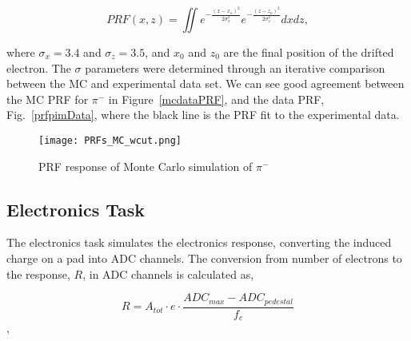 \begin{equation}
PRF(x,z) = \iint e^{-\frac{(x-x_o)^2}{2\sigma_x^2}} e^{-\frac{(z-z_o)^2}{2\sigma_z^2}}dxdz,
\end{equation}

where $\sigma_x = 3.4$ and $\sigma_z = 3.5$, and $x_0$ and $z_0$ are the final position of the drifted electron. The $\sigma$ parameters were determined through an iterative comparison between the MC and experimental data set. We can see good agreement between the MC PRF for $\pi^-$ in Figure~\ref{mcdataPRF}, and the data PRF, Fig.~\ref{prfpimData}, where the black line is the PRF fit to the experimental data.

\begin{figure}[!htb]
         \centering
         \texttt{[image: PRFs\_MC\_wcut.png]}
         \caption{PRF response of Monte Carlo simulation of $\pi^-$}
         \label{fig:prfpimMC}
\end{figure}



\subsection{Electronics Task}


The electronics task simulates the electronics response, converting  the induced charge on a pad into ADC channels. The conversion from number of electrons to the response, $R$, in ADC channels is calculated as, 

\begin{equation}
R = A_{tot} \cdot e \cdot\frac{ADC_{max} - ADC_{pedestal}}{f_c}
\label{eq:etoADC}
\end{equation},

